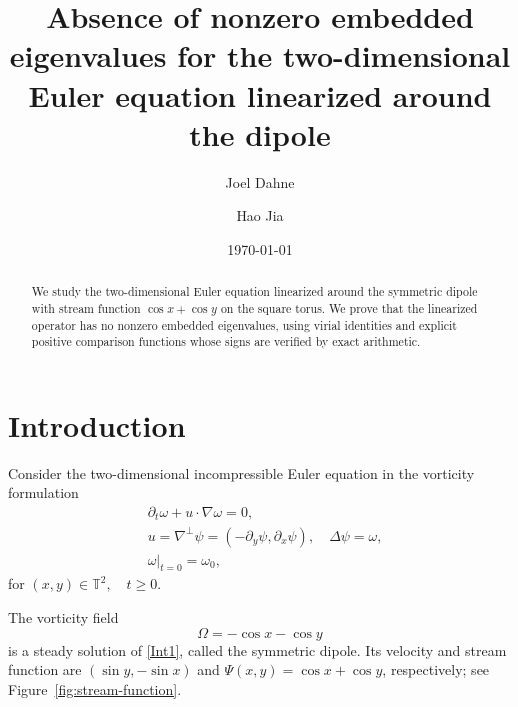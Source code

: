 \documentclass[reqno,11pt]{amsart}
\title[Embedded eigenvalues for the linearized dipole]{Absence of nonzero embedded eigenvalues for the two-dimensional Euler equation linearized around the dipole}
\author{Joel Dahne}
\author{Hao Jia}
\date{\today}
\numberwithin{equation}{section}
\theoremstyle{remark}
\newcommand{\T}{\mathbb T}
\begin{document}
\begin{abstract}
We study the two-dimensional Euler equation linearized around the
symmetric dipole with stream function $\cos x+\cos y$ on the square
torus. We prove that the linearized operator has no nonzero embedded
eigenvalues, using virial identities and explicit positive comparison
functions whose signs are verified by exact arithmetic.
\end{abstract}

\maketitle
\tableofcontents
\section{Introduction}

Consider the two-dimensional incompressible Euler equation in the vorticity formulation
\begin{equation}\label{Int1}
    \begin{split}
        &\partial_t\omega+u\cdot\nabla \omega=0,\\
        &u=\nabla^\perp \psi=(-\partial_y\psi,\partial_x\psi),\quad \Delta\psi=\omega,\\
        &\omega|_{t=0}=\omega_0,
    \end{split}
\end{equation}
for $(x,y)\in\T^2,\quad t\ge0$.

The vorticity field
\begin{equation}\label{Int1.1}
\Omega=-\cos x - \cos y
\end{equation}
is a steady solution of \eqref{Int1}, called the symmetric dipole.
Its velocity and stream function are $(\sin y,-\sin x)$ and
$\Psi(x,y)=\cos x+\cos y$, respectively; see
Figure~\ref{fig:stream-function}.
\end{document}
